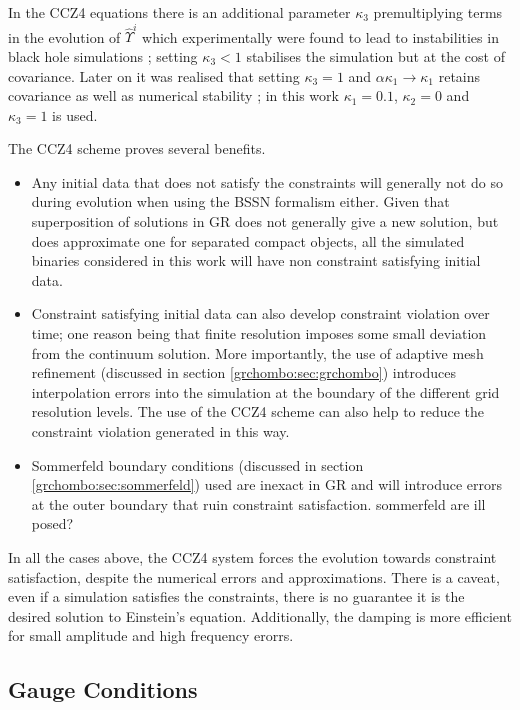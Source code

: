 In the CCZ4 equations there is an additional parameter $\kappa_3$ premultiplying terms in the evolution of $\hat{\Upsilon}^i$ which experimentally were found to lead to instabilities in black hole simulations \cite{PhysRevD.85.064040}; setting $\kappa_3<1$ stabilises the simulation but at the cost of covariance. Later on it was realised that setting $\kappa_3=1$ and $\alpha\kappa_1\rightarrow\kappa_1$ retains covariance as well as numerical stability \cite{Alic:2013xsa}; in this work $\kappa_1=0.1$, $\kappa_2=0$ and $\kappa_3=1$ is used.


The CCZ4 scheme proves several benefits.
\begin{itemize}
\item Any initial data that does not satisfy the constraints will generally not do so during evolution when using the BSSN formalism either. Given that superposition of solutions in GR does not generally give a new solution, but does approximate one for separated compact objects, all the simulated binaries considered in this work will have non constraint satisfying initial data.
\item Constraint satisfying initial data can also develop constraint violation over time; one reason being that finite resolution imposes some small deviation from the continuum solution. More importantly, the use of adaptive mesh refinement (discussed in section \ref{grchombo:sec:grchombo}) introduces interpolation errors into the simulation at the boundary of the different grid resolution levels. The use of the CCZ4 scheme can also help to reduce the constraint violation generated in this way.
\item Sommerfeld boundary conditions (discussed in section \ref{grchombo:sec:sommerfeld}) used are inexact in GR and will introduce errors at the outer boundary that ruin constraint satisfaction. \color{gren} sommerfeld are ill posed? \color{black}
\end{itemize}
In all the cases above, the CCZ4 system forces the evolution towards constraint satisfaction, despite the numerical errors and approximations. There is a caveat, even if a simulation satisfies the constraints, there is no guarantee it is the desired solution to Einstein's equation. \color{orchid} Additionally, the damping is more efficient for small amplitude and high frequency erorrs. \color{black}



\subsection{Gauge Conditions}\label{nr:sec:gaugeconditions}

